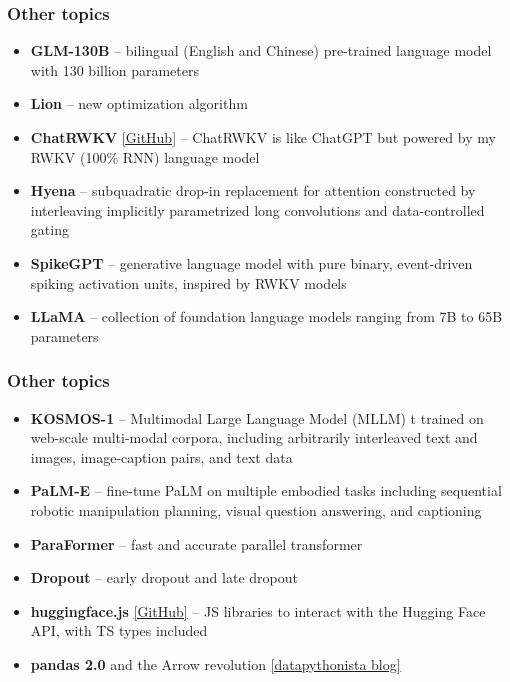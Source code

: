 \documentclass{beamer}
\begin{document}
\begin{frame}
    \frametitle{Other topics}
    \begin{itemize}
        \item \textbf{GLM-130B} \cite{glm_130b} -- bilingual (English and Chinese) pre-trained language model with 130 billion parameters
        \item \textbf{Lion} \cite{lion} -- new optimization algorithm
    	    \item \textbf{ChatRWKV} \href{https://github.com/BlinkDL/ChatRWKV}{[GitHub]} -- ChatRWKV \cite{rwkv} is like ChatGPT but powered by my RWKV (100\% RNN) language model
        \item \textbf{Hyena} \cite{hyena} -- subquadratic drop-in replacement for attention constructed by interleaving implicitly parametrized long convolutions and data-controlled gating
    	    \item \textbf{SpikeGPT} \cite{spikegpt} -- generative language model with pure binary, event-driven spiking activation units, inspired by RWKV models
    	    \item \textbf{LLaMA} \cite{llama} -- collection of foundation language models ranging from 7B to 65B parameters
    \end{itemize}
\end{frame}

\begin{frame}
    \frametitle{Other topics}
    \begin{itemize}
    	    \item \textbf{KOSMOS-1} \cite{kosmos} -- Multimodal Large Language Model (MLLM) t trained on web-scale multi-modal corpora, including arbitrarily interleaved text and images, image-caption pairs, and text data
    	    \item \textbf{PaLM-E} \cite{palme} -- fine-tune PaLM on multiple embodied tasks including sequential robotic manipulation planning, visual question answering, and captioning
    	    \item \textbf{ParaFormer} \cite{paraformer} -- fast and accurate parallel transformer
    	    \item \textbf{Dropout} \cite{dropout} -- early dropout and late dropout
    	    \item \textbf{huggingface.js} \href{https://github.com/huggingface/huggingface.js}{[GitHub]} -- JS libraries to interact with the Hugging Face API, with TS types included
    	    \item \textbf{pandas 2.0} and the Arrow revolution \href{https://datapythonista.me/blog/pandas-20-and-the-arrow-revolution-part-i}{[datapythonista blog]}
    \end{itemize}
\end{frame}
\end{document}
